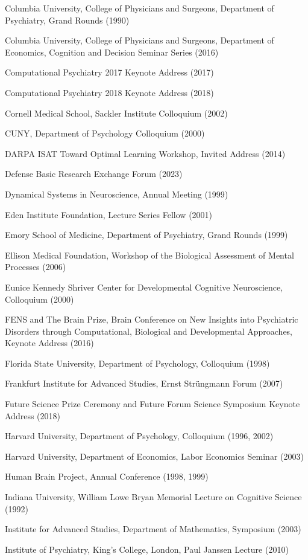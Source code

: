 \documentclass[10 pt]{article}
\begin{document}
Columbia University, College of Physicians and Surgeons,
Department of Psychiatry, Grand Rounds (1990)

Columbia University, College of Physicians and Surgeons,
Department of Economics, Cognition and Decision Seminar Series (2016)

Computational Psychiatry 2017 Keynote Address (2017)

Computational Psychiatry 2018 Keynote Address (2018)

Cornell Medical School, Sackler Institute Colloquium (2002)

CUNY, Department of Psychology Colloquium (2000)

DARPA ISAT Toward Optimal Learning Workshop, Invited Address (2014)

Defense Basic Research Exchange Forum (2023)

Dynamical Systems in Neuroscience, Annual Meeting (1999)

Eden Institute Foundation, Lecture Series Fellow (2001)

Emory School of Medicine, Department of Psychiatry, Grand Rounds (1999)

Ellison Medical Foundation, Workshop of the Biological Assessment of Mental Processes (2006)

Eunice Kennedy Shriver Center for Developmental Cognitive Neuroscience, Colloquium (2000)

FENS and The Brain Prize, Brain Conference on New Insights into Psychiatric Disorders through Computational, Biological and Developmental Approaches, Keynote Address (2016)

Florida State University, Department of Psychology, Colloquium (1998)

Frankfurt Institute for Advanced Studies, Ernst Strüngmann Forum (2007)

Future Science Prize Ceremony and Future Forum Science Symposium Keynote Address (2018)

Harvard University, Department of Psychology, Colloquium (1996, 2002)

Harvard University, Department of Economics, Labor Economics Seminar (2003)

Human Brain Project, Annual Conference (1998, 1999)

Indiana University, William Lowe Bryan Memorial Lecture on Cognitive Science (1992)

Institute for Advanced Studies, Department of Mathematics, Symposium (2003)

Institute of Psychiatry, King’s College, London, Paul Janssen Lecture (2010)
\end{document}
